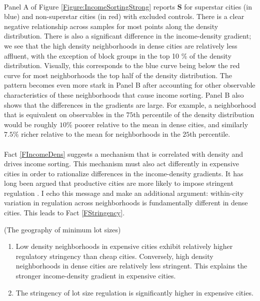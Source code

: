 \documentclass[12pt]{article}
\begin{document}
	\paragraph*{}
	Panel A of Figure \ref{Figure:IncomeSortingStrong} reports $\mathbf{S}$ for superstar cities (in blue) and non-superstar cities (in red) with excluded controls. There is a clear negative relationship across samples for most points along the density distribution. There is also a significant difference in the income-density gradient; we see that the high density neighborhoods in dense cities are relatively less affluent, with the exception of block groups in the top 10 \% of the density distribution. Visually, this corresponds to the blue curve being below the red curve for most neighborhoods the top half of the density distribution. The pattern becomes even more stark in Panel B after accounting for other observable characteristics of these neighborhoods that cause income sorting. Panel B also shows that the differences in the gradients are large. For example, a neighborhood that is equivalent on observables in the $75$th percentile of the density distribution would be roughly $10$\% poorer relative to the mean in dense cities, and similarly $7.5$\% richer relative to the mean for neighborhoods in the $25$th percentile. 

	\paragraph*{} 
	Fact \ref{FIncomeDens} suggests a mechanism that is correlated with density and drives income sorting. This mechanism must also act differently in expensive cities in order to rationalize differences in the income-density gradients. It has long been argued that productive cities are more likely to impose stringent regulation \citep{HILBER2013,parkho, durantonpugaurbgrowth}. I echo this message and make an additional argument: within-city variation in regulation across neighborhoods is fundamentally different in dense cities. This leads to Fact \ref{FStringency}. 

	\begin{Fact}\label{FStringency}
		(The geography of minimum lot sizes)
		\begin{enumerate}
			\item  Low density neighborhoods in expensive cities exhibit relatively higher regulatory stringency than cheap cities. Conversely, high density neighborhoods in dense cities are relatively less stringent. This explains the stronger income-density gradient in expensive cities. 		
			\item  The stringency of lot size regulation is significantly higher in expensive cities. 
		\end{enumerate}
	\end{Fact}
	
\end{document}

